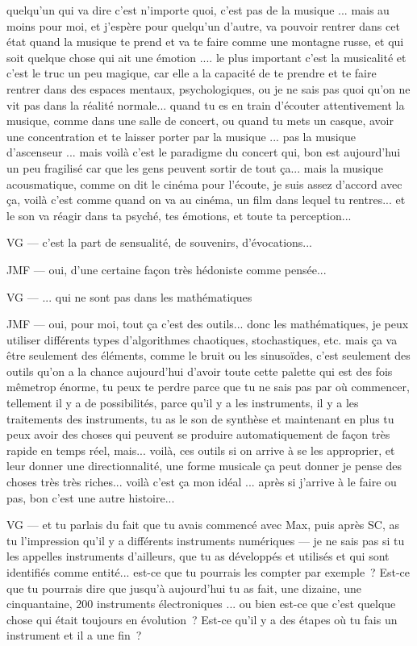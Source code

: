 quelqu'un qui va dire c'est n'importe quoi, c'est pas de la musique ... mais au moins pour moi, et j'espère pour quelqu'un d'autre, va pouvoir rentrer dans cet état quand la musique te prend et va te faire comme une montagne russe, et qui soit quelque chose qui ait une émotion .... le plus important c'est la musicalité et c'est le truc un peu magique, car elle a la capacité de te prendre et te faire rentrer dans des espaces mentaux, psychologiques, ou je ne sais pas quoi qu'on ne vit pas dans la réalité normale... quand tu es en train d'écouter attentivement la musique, comme dans une salle de concert, ou quand tu mets un casque, avoir une concentration et te laisser porter par la musique ... pas la musique d'ascenseur ... mais voilà c'est le paradigme du concert qui, bon est aujourd'hui un peu fragilisé car que les gens peuvent sortir de tout ça... mais la musique acousmatique, comme on dit le cinéma pour l'écoute, je suis assez d'accord avec ça, voilà c'est comme quand on va au cinéma, un film dans lequel tu rentres... et le son va réagir dans ta psyché, tes émotions, et toute ta perception...  

VG — c'est la part de sensualité, de souvenirs, d'évocations...  

JMF — oui, d'une certaine façon très hédoniste comme pensée... 

VG — ... qui ne sont pas dans les mathématiques 

JMF — oui, pour moi, tout ça c'est des outils... donc les mathématiques, je peux utiliser différents types d'algorithmes chaotiques, stochastiques, etc. mais ça va être seulement des éléments, comme le bruit ou les sinusoïdes, c'est seulement des outils qu'on a la chance aujourd'hui d'avoir toute cette palette qui est des fois mêmetrop énorme, tu peux te perdre parce que tu ne sais pas par où commencer, tellement il y a de possibilités, parce qu'il y a les instruments, il y a les traitements des instruments, tu as le son de synthèse et maintenant en plus tu peux avoir des choses qui peuvent se produire automatiquement de façon très rapide en temps réel, mais... voilà, ces outils si on arrive à se les approprier, et leur donner une directionnalité, une forme musicale ça peut donner je pense des choses très très riches... voilà c'est ça mon idéal ... après si j'arrive à le faire ou pas, bon c'est une autre histoire... 

VG — et tu parlais du fait que tu avais commencé avec Max, puis après SC, as tu l'impression qu'il y a différents instruments numériques — je ne sais pas si tu les appelles instruments d'ailleurs, que tu as développés et utilisés et qui sont identifiés comme entité... est-ce que tu pourrais les compter par exemple ? Est-ce que tu pourrais dire que jusqu'à aujourd'hui tu as fait, une dizaine, une cinquantaine, 200 instruments électroniques ... ou bien est-ce que c'est quelque chose qui était toujours en évolution ? Est-ce qu'il y a des étapes où tu fais un instrument et il a une fin ? 

